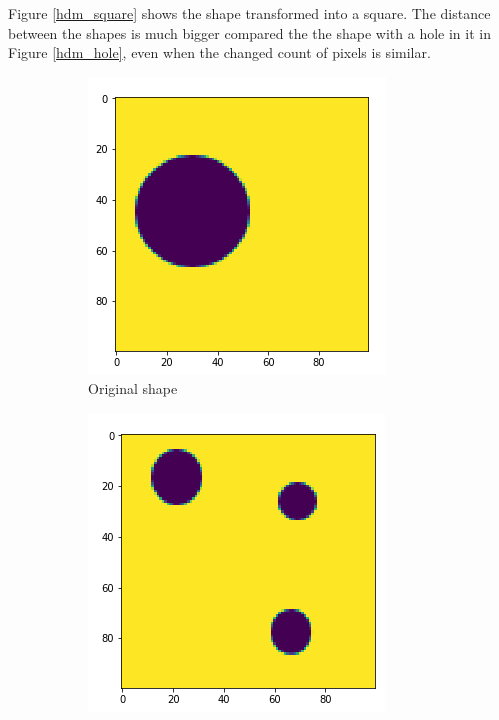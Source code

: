 Figure \ref{hdm_square} shows the shape transformed into a square. The distance between the shapes is much bigger compared the the shape with a hole in it in Figure \ref{hdm_hole}, even when the
changed count of pixels is similar.


\begin{figure}[H]
    \centering
    \begin{subfigure}{.35\textwidth}
        \centering
        \includegraphics[width=\linewidth]{chapters/06_hdm/images/hdm_original.png}
        \caption{Original shape}
    \end{subfigure}%
    \begin{subfigure}{.35\textwidth}
        \centering
        \includegraphics[width=\linewidth]{chapters/06_hdm/images/hdm_smaller_circles.png}

\end{subfigure}
\end{figure}
